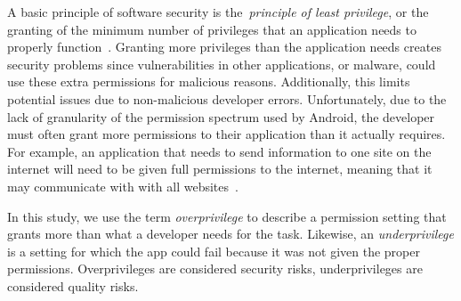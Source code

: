 A basic principle of software security is the~\emph{principle of least privilege}, or the granting of the minimum number of privileges that an application needs to properly function~\cite{saltzer1975protection}. Granting more privileges than the application needs creates security problems since vulnerabilities in other applications, or malware, could use these extra permissions for malicious reasons. Additionally, this limits potential issues due to non-malicious developer errors. Unfortunately, due to the lack of granularity of the permission spectrum used by Android, the developer must often grant more permissions to their application than it actually requires. For example, an application that needs to send information to one site on the internet will need to be given full permissions to the internet, meaning that it may communicate with with all websites~\cite{jeon2011dr}.

In this study, we use the term \emph{overprivilege} to describe a permission setting that grants more than what a developer needs for the task. Likewise, an \emph{underprivilege} is a setting for which the app could fail because it was not given the proper permissions. Overprivileges are considered security risks, underprivileges are considered quality risks.



